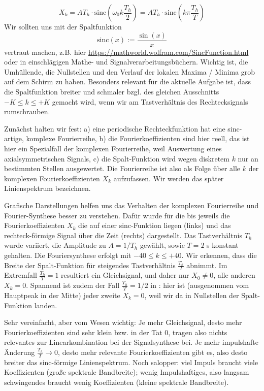 \begin{Loesung}
%
\begin{equation}
\label{eq:D1483A84E2_Loesung}
 X_k = A T_h \cdot \mathrm{sinc}(\omega_0 k \frac{T_h}{2}) = A T_h \cdot \mathrm{sinc}(k \pi \frac{T_h}{T})
\end{equation}
%
Wir sollten uns mit der Spaltfunktion
\begin{equation}
\mathrm{sinc}(x) := \frac{\sin(x)}{x}
\end{equation}
vertraut machen, z.B.
hier \url{https://mathworld.wolfram.com/SincFunction.html} oder in einschlägigen
Mathe- und Signalverarbeitungsbüchern. Wichtig ist, die Umhüllende, die Nullstellen
und den Verlauf der lokalen Maxima / Minima grob auf dem Schirm zu haben.
%
Besonders relevant für die aktuelle Aufgabe ist, dass die Spaltfunktion
breiter und schmaler bzgl. des gleichen Ausschnitts
$-K \leq k \leq +K$ gemacht wird, wenn wir am Tastverhältnis des Rechtecksignals
rumschrauben.

Zunächst halten wir fest: a) eine periodische Rechteckfunktion hat eine sinc-artige,
komplexe Fourierreihe, b) die Fourierkoeffizienten sind hier reell, das ist
hier ein Spezialfall der komplexen Fourierreihe, weil Auswertung eines
axialsymmetrischen Signals, c) die Spalt-Funktion wird
wegen diskretem $k$ nur an bestimmten Stellen ausgewertet.
Die Fourierreihe ist also als Folge
über alle $k$ der komplexen Fourierkoeffizienten $X_k$ aufzufassen. Wir werden
das später Linienspektrum bezeichnen.

Grafische Darstellungen helfen uns das Verhalten der komplexen Fourierreihe und
Fourier-Synthese besser zu verstehen.
%
Dafür wurde für die  bis 
jeweils die Fourierkoeffizienten $X_k$ die auf einer sinc-Funktion liegen (links)
und das rechteck-förmige Signal über die Zeit
(rechts) dargestellt.
Das Tastverhältnis $T_h$ wurde
variiert, die Amplitude zu $A = 1/T_h$ gewählt, sowie $T=2$ s konstant gehalten.
%
Die Fouriersynthese erfolgt mit $-40 \leq k \leq +40$.
%
Wir erkennen, dass die Breite der Spalt-Funktion für steigendes Tastverhältnis
$\frac{T_h}{T}$ abnimmt.
%
Im Extremfall $\frac{T_h}{T} = 1$ resultiert ein Gleichsignal, und daher
nur $X_0 \neq 0$, alle anderen $X_k=0$.
%
Spannend ist zudem der Fall $\frac{T_h}{T} = 1/2$ in :
hier ist (ausgenommen vom Hauptpeak in der Mitte) jeder zweite $X_k=0$,
weil wir da in Nullstellen der Spalt-Funktion landen.

Sehr vereinfacht, aber vom Wesen wichtig:
Je mehr Gleichsignal, desto mehr Fourierkoeffizienten sind sehr klein bzw. in der Tat $0$,
tragen also nichts relevantes zur Linearkombination bei der Signalsynthese bei.
Je mehr impulshafte Änderung
$\frac{T_h}{T} \to  0$, desto mehr relevante Fourierkoeffizienten gibt es,
also desto breiter das sinc-förmige Linienspektrum.
%
Noch salopper: viel Impuls braucht viele Koeffizienten (große spektrale Bandbreite);
wenig Impulshaftiges, also langsam schwingendes braucht wenig Koeffizienten
(kleine spektrale Bandbreite).


\end{Loesung}


